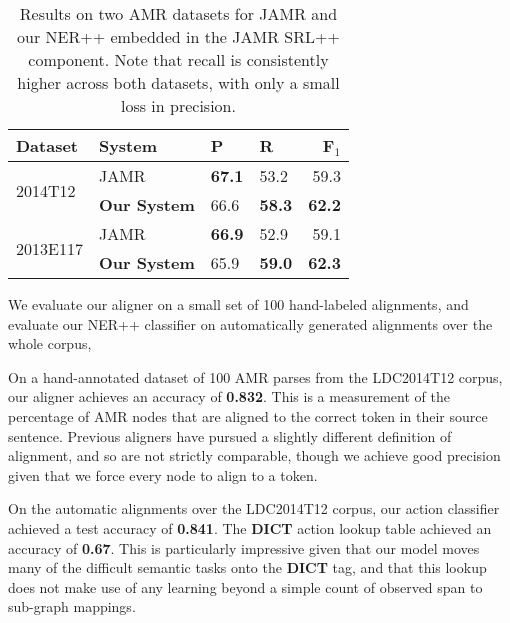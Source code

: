 \documentclass[11pt]{article}
\begin{document}

\begin{table}[t]
\begin{center}
\begin{tabular}{l|l|llr}
\textbf{Dataset} &  \textbf{System} & \textbf{P} & \textbf{R} & \textbf{F$_1$} \\
\hline
\multirow{2}{*}{2014T12} & JAMR & \textbf{67.1} & 53.2 & 59.3 \\
  & \textbf{Our System} & 66.6 & \textbf{58.3} & \textbf{62.2} \\
\hline
\multirow{2}{*}{2013E117} & JAMR & \textbf{66.9} & 52.9 & 59.1 \\
  & \textbf{Our System} & 65.9 & \textbf{59.0} & \textbf{62.3} \\
\end{tabular}
\end{center}
\caption{\label{tab:results} 
Results on two AMR datasets for JAMR and our NER++ embedded in the JAMR SRL++
  component.
Note that recall is consistently higher across both datasets, with only a small
  loss in precision.
}
\end{table}

We evaluate our aligner on a small set of 100 hand-labeled alignments,
  and evaluate our NER++ classifier on automatically generated alignments over the whole corpus,
  
On a hand-annotated dataset of 100 AMR parses from the LDC2014T12 corpus, our aligner achieves
  an accuracy of \textbf{0.832}.
This is a measurement of the percentage of AMR nodes that are
  aligned to the correct token in their source sentence.
Previous aligners have pursued a slightly different definition of alignment,
  and so are not strictly comparable, though we achieve good precision given that we force every node
  to align to a token.


On the automatic alignments over the LDC2014T12 corpus,
  our action classifier achieved a test accuracy of \textbf{0.841}.
The \textbf{DICT} action lookup table achieved an accuracy of \textbf{0.67}.
This is particularly impressive given that our model moves many of the difficult 
  semantic tasks onto the \textbf{DICT} tag, and that this lookup does not make
  use of any learning beyond a simple count of observed span to sub-graph mappings.
\end{document}
